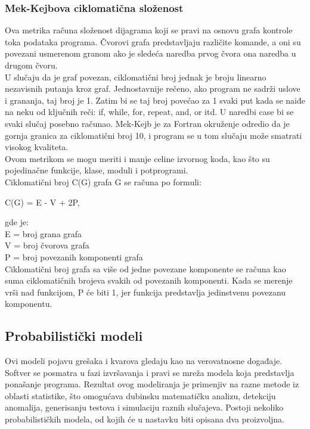 \documentclass[a4paper]{article}
\begin{document}
\subsubsection{Mek-Kejbova ciklomatična složenost}
\label{subsec:mekkejb}

Ova metrika računa složenost dijagrama koji se pravi na osnovu grafa kontrole toka podataka programa. Čvorovi grafa predstavljaju različite komande, a oni su povezani usmerenom granom ako je sledeća naredba prvog čvora ona naredba u drugom čvoru. \\
U slučaju da je graf povezan, ciklomatični broj jednak je broju linearno nezavisnih putanja kroz graf. Jednostavnije rečeno, ako program ne sadrži uslove i grananja, taj broj je 1. Zatim bi se taj broj povećao za 1 svaki put kada se naiđe na neku od ključnih reči: if, while, for, repeat, and, or itd. U naredbi case bi se svaki slučaj posebno računao. Mek-Kejb je za Fortran okruženje odredio da je gornja granica za ciklomatični broj 10, i program se u tom slučaju može smatrati visokog kvaliteta.\cite{mccabe_fortran}\\
Ovom metrikom se mogu meriti i manje celine izvornog koda, kao što su pojedinačne funkcije, klase, moduli i potprogrami.\\
Ciklomatični broj C(G) grafa G se računa po formuli:
\begin{center}
C(G) = E - V + 2P,
\end{center}
gde je:\\
E = broj grana grafa\\
V = broj čvorova grafa\\
P = broj povezanih komponenti grafa\\

Ciklomatični broj grafa sa više od jedne povezane komponente se računa kao suma ciklomatičnih brojeva svakih od povezanih komponenti. Kada se merenje vrši nad funkcijom,  P će biti 1, jer funkcija predstavlja jedinstvenu povezanu komponentu.\\

\subsection{Probabilistički modeli}
\label{sec:probabilisticki}

Ovi modeli pojavu grešaka i kvarova gledaju kao na verovatnosne događaje. Softver se posmatra u fazi izvršavanja i pravi se mreža modela koja predstavlja ponašanje programa. Rezultat ovog modeliranja je primenjiv na razne metode iz oblasti statistike, što omogućava dubinsku matematičku analizu, detekciju anomalija, generisanju testova i simulaciju raznih slučajeva. Postoji nekoliko probabilističkih modela, od kojih će u nastavku biti opisana dva proizvoljna. \\
\end{document}
